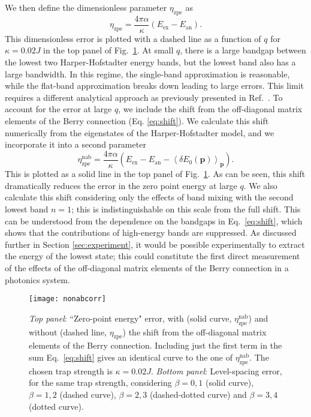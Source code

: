 \documentclass[twocolumn, 10pt, aps, superscriptaddress, floatfix, showpacs, pra, citeautoscript]{revtex4-1}
\newcommand{\vt}[1]{\mathbf{#1}}
\begin{document}
We then define the dimensionless parameter $\eta_{\text{zpe}}$ as 
\begin{equation}
\eta_{\text{zpe}} = \frac{4\pi\alpha}{\kappa} (E_{\text{ex}} -E_{\text{an}}). 
\end{equation}
This dimensionless error is plotted with a dashed line as a function of $q$ for $\kappa=0.02 J$ in the top panel of Fig.~\ref{fig:zpe}. At small $q$, there is a large bandgap between the lowest two Harper-Hofstadter energy bands, but the lowest band also has a large bandwidth. In this regime, the single-band approximation is reasonable, while the flat-band approximation breaks down leading to large errors. This limit requires a different analytical approach as  previously presented in Ref.~.
To account for the error at large $q$, we include the shift from the off-diagonal matrix elements of the Berry connection (Eq. \ref{eq:shift}). We calculate this shift numerically from the eigenstates of the Harper-Hofstadter model, and we incorporate it into a second parameter 
\begin{equation}
\eta_{\text{zpe}}^{\text{nab}} = \frac{4\pi\alpha}{\kappa}(E_{\text{ex}} - E_{\text{an}} - \left<\delta  E_0(\vt{p})\right>_{\vt{p}}).
\end{equation}
This is plotted as a solid line in the top panel of Fig.~\ref{fig:zpe}. As can be seen, this shift dramatically reduces the error in the zero point energy at large $q$. We also calculate this shift considering only the effects of band mixing with the second lowest band $n=1$; this is indistinguishable on this scale from the full shift. This can be understood from the dependence on the bandgaps in Eq.~\ref{eq:shift}, which shows that the contributions of high-energy bands are suppressed. As discussed further in Section \ref{sec:experiment}, it would be possible experimentally to extract the energy of the lowest state; this could constitute the first direct measurement of the effects of the off-diagonal matrix elements of the Berry connection in a photonics system.

\begin{figure}[tb]\centering
  \texttt{[image: nonabcorr]} %
  \caption{\emph{Top panel}: ``Zero-point energy" error, with (solid curve,
    $\eta_{\text{zpe}}^{\text{nab}}$) and without (dashed line,
    $\eta_{\text{zpe}}$) the shift from the off-diagonal matrix elements of the Berry connection. Including just the
    first term in the sum Eq.~\eqref{eq:shift} gives an identical
    curve to the one of $\eta_{\text{zpe}}^{\text{nab}}$. The chosen
    trap strength is $\kappa = 0.02 J$.  \emph{Bottom panel}: Level-spacing
    error, for the same trap strength, considering $\beta = 0,1$
    (solid curve), $\beta = 1,2$ (dashed curve), $\beta = 2,3$
    (dashed-dotted curve) and $\beta = 3,4$ (dotted curve).}
  \label{fig:zpe}
\end{figure}
\end{document}
